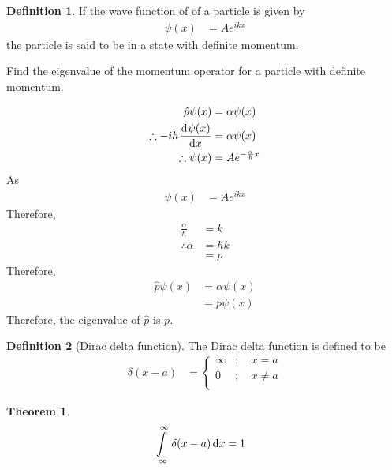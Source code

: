 \documentclass[titlepage, fleqn, a4paper, 12pt, twoside]{article}
\theoremstyle{definition}
\newtheorem{definition}{Definition}
\theoremstyle{theorem}
\newtheorem{theorem}{Theorem}
\begin{document}
\begin{definition}
	If the wave function of of a particle is given by
	\begin{align*}
		\psi(x) &= A e^{i k x}
	\end{align*}
	the particle is said to be in a state with definite momentum.
\end{definition}

\begin{question}
	Find the eigenvalue of the momentum operator for a particle with definite momentum.
\end{question}

\begin{solution}
	\begin{align*}
		\hat{p} \psi(x) &= \alpha \psi(x)\\
		\therefore -i \hbar \dod{\psi(x)}{x} &= \alpha \psi(x)\\
		\therefore \psi(x) &= A e^{-\frac{\alpha}{\hbar} x}
	\end{align*}
	As
	\begin{align*}
		\psi(x) &= A e^{i k x}
	\end{align*}
	Therefore,
	\begin{align*}
		\frac{\alpha}{\hbar} &= k\\
		\therefore \alpha &= \hbar k\\
		&= p
	\end{align*}
	Therefore,
	\begin{align*}
		\hat{p} \psi(x) &= \alpha \psi(x)\\
		&= p \psi(x)
	\end{align*}
	Therefore, the eigenvalue of $\hat{p}$ is $p$.
\end{solution}

\begin{definition}[Dirac delta function]
	The Dirac delta function is defined to be
	\begin{align*}
		\delta(x - a) &=
			\begin{cases}
				\infty &;\quad x = a\\
				0 &;\quad x \neq a\\
			\end{cases}
	\end{align*}
\end{definition}

\begin{theorem}
	\begin{align*}
		\int\limits_{-\infty}^{\infty} \delta(x - a) \dif x &= 1
	\end{align*}
\end{theorem}
\end{document}
